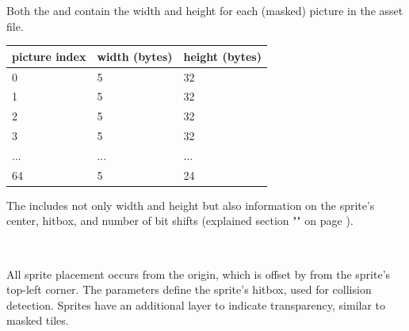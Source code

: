 \documentclass[book.tex]{subfiles}
\begin{document}
\pagebreak
Both the  and  contain the width and height for each (masked) picture in the asset file.\\
  \begin{table}[H]
  \begin{tabularx}{0.8\textwidth}[c]{XXX}
  \hline
  \textbf{picture index} & \textbf{width (bytes)} & \textbf{height (bytes)}   \\ \hline
  0             & 5          & 32    \\
  1             & 5          & 32    \\
  2             & 5          & 32    \\
  3             & 5          & 32    \\
  ...             & ...          & ...    \\
  64             & 5          & 24    \\
  \end{tabularx}
  \end{table}

\par
The  includes not only width and height but also information on the sprite's center, hitbox, and number of bit shifts (explained section "" on page \pageref{section:drawing_sprites}). \\

\par
\begin{minipage}{\textwidth}
 \par
 \end{minipage}\\


\par
All sprite placement occurs from the origin, which is offset by  from the sprite's top-left corner. The parameters  define the sprite's hitbox, used for collision detection. Sprites have an additional layer to indicate transparency, similar to masked tiles.
\end{document}
